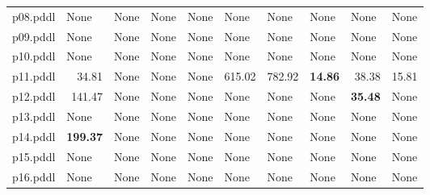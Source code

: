\documentclass{article}
\begin{document}
\begin{tabular}{@{}lrrrrrrrrr@{}}
p08.pddl & \multicolumn{1}{|l|}{None} & \multicolumn{1}{|l|}{None} & \multicolumn{1}{|l|}{None} & \multicolumn{1}{|l|}{None} & \multicolumn{1}{|l|}{None} & \multicolumn{1}{|l|}{None} & \multicolumn{1}{|l|}{None} & \multicolumn{1}{|l|}{None} & \multicolumn{1}{|l|}{None} \\
p09.pddl & \multicolumn{1}{|l|}{None} & \multicolumn{1}{|l|}{None} & \multicolumn{1}{|l|}{None} & \multicolumn{1}{|l|}{None} & \multicolumn{1}{|l|}{None} & \multicolumn{1}{|l|}{None} & \multicolumn{1}{|l|}{None} & \multicolumn{1}{|l|}{None} & \multicolumn{1}{|l|}{None} \\
p10.pddl & \multicolumn{1}{|l|}{None} & \multicolumn{1}{|l|}{None} & \multicolumn{1}{|l|}{None} & \multicolumn{1}{|l|}{None} & \multicolumn{1}{|l|}{None} & \multicolumn{1}{|l|}{None} & \multicolumn{1}{|l|}{None} & \multicolumn{1}{|l|}{None} & \multicolumn{1}{|l|}{None} \\
p11.pddl & 34.81 & \multicolumn{1}{|l|}{None} & \multicolumn{1}{|l|}{None} & \multicolumn{1}{|l|}{None} & 615.02 & 782.92 & \textbf{14.86} & 38.38 & 15.81 \\
p12.pddl & 141.47 & \multicolumn{1}{|l|}{None} & \multicolumn{1}{|l|}{None} & \multicolumn{1}{|l|}{None} & \multicolumn{1}{|l|}{None} & \multicolumn{1}{|l|}{None} & \multicolumn{1}{|l|}{None} & \textbf{35.48} & \multicolumn{1}{|l|}{None} \\
p13.pddl & \multicolumn{1}{|l|}{None} & \multicolumn{1}{|l|}{None} & \multicolumn{1}{|l|}{None} & \multicolumn{1}{|l|}{None} & \multicolumn{1}{|l|}{None} & \multicolumn{1}{|l|}{None} & \multicolumn{1}{|l|}{None} & \multicolumn{1}{|l|}{None} & \multicolumn{1}{|l|}{None} \\
p14.pddl & \textbf{199.37} & \multicolumn{1}{|l|}{None} & \multicolumn{1}{|l|}{None} & \multicolumn{1}{|l|}{None} & \multicolumn{1}{|l|}{None} & \multicolumn{1}{|l|}{None} & \multicolumn{1}{|l|}{None} & \multicolumn{1}{|l|}{None} & \multicolumn{1}{|l|}{None} \\
p15.pddl & \multicolumn{1}{|l|}{None} & \multicolumn{1}{|l|}{None} & \multicolumn{1}{|l|}{None} & \multicolumn{1}{|l|}{None} & \multicolumn{1}{|l|}{None} & \multicolumn{1}{|l|}{None} & \multicolumn{1}{|l|}{None} & \multicolumn{1}{|l|}{None} & \multicolumn{1}{|l|}{None} \\
p16.pddl & \multicolumn{1}{|l|}{None} & \multicolumn{1}{|l|}{None} & \multicolumn{1}{|l|}{None} & \multicolumn{1}{|l|}{None} & \multicolumn{1}{|l|}{None} & \multicolumn{1}{|l|}{None} & \multicolumn{1}{|l|}{None} & \multicolumn{1}{|l|}{None} & \multicolumn{1}{|l|}{None} \\

\end{tabular}
\end{document}
